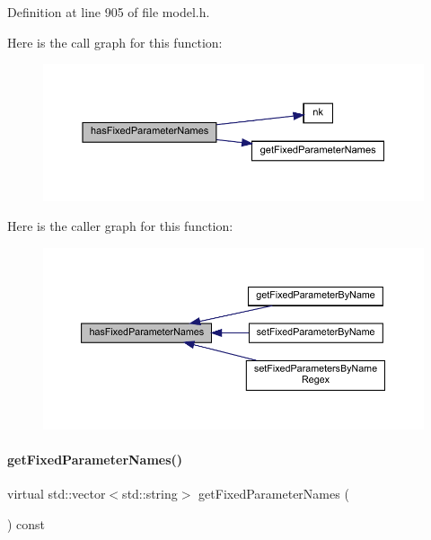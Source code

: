 Definition at line 905 of file model.\+h.

Here is the call graph for this function\+:
\nopagebreak
\begin{figure}[H]
\begin{center}
\leavevmode
\includegraphics[width=350pt]{classamici_1_1_model_a964e924a1fe271f88bac4cfa909e2879_cgraph}
\end{center}
\end{figure}
Here is the caller graph for this function\+:
\nopagebreak
\begin{figure}[H]
\begin{center}
\leavevmode
\includegraphics[width=350pt]{classamici_1_1_model_a964e924a1fe271f88bac4cfa909e2879_icgraph}
\end{center}
\end{figure}
\mbox{\label{classamici_1_1_model_a40260fd33966dc70d0edfa21bf655012}} 
\paragraph{\texorpdfstring{get\+Fixed\+Parameter\+Names()}{getFixedParameterNames()}}
{\footnotesize\ttfamily virtual std\+::vector$<$std\+::string$>$ get\+Fixed\+Parameter\+Names (\begin{DoxyParamCaption}{ }\end{DoxyParamCaption}) const\hspace{0.3cm}{\ttfamily [virtual]}}

